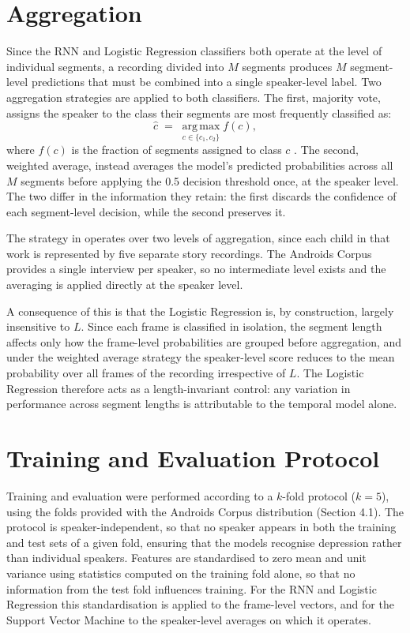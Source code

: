\documentclass{mproj}
\begin{document}
\section{Aggregation}\label{sec:aggregation}

Since the RNN and Logistic Regression classifiers both operate at the level of individual segments, a recording divided into $M$ segments produces $M$ segment-level predictions that must be combined into a single speaker-level label. Two aggregation strategies are applied to both classifiers. The first, majority vote, assigns the speaker to the class their segments are most frequently classified as:
%
\begin{equation}
\hat{c} \;=\; \operatorname*{arg\,max}_{c \in \{c_1, c_2\}} f(c),
\end{equation}
%
where $f(c)$ is the fraction of segments assigned to class $c$ \cite{alsofyani2021}. The second, weighted average, instead averages the model's predicted probabilities across all $M$ segments before applying the 0.5 decision threshold once, at the speaker level. The two differ in the information they retain: the first discards the confidence of each segment-level decision, while the second preserves it.

The strategy in \cite{alsofyani2021} operates over two levels of aggregation, since each child in that work is represented by five separate story recordings. The Androids Corpus provides a single interview per speaker, so no intermediate level exists and the averaging is applied directly at the speaker level.

A consequence of this is that the Logistic Regression is, by construction, largely insensitive to $L$. Since each frame is classified in isolation, the segment length affects only how the frame-level probabilities are grouped before aggregation, and under the weighted average strategy the speaker-level score reduces to the mean probability over all frames of the recording irrespective of $L$. The Logistic Regression therefore acts as a length-invariant control: any variation in performance across segment lengths is attributable to the temporal model alone.

\section{Training and Evaluation Protocol}\label{sec:training}

Training and evaluation were performed according to a $k$-fold protocol ($k = 5$), using the folds provided with the Androids Corpus distribution (Section 4.1). The protocol is speaker-independent, so that no speaker appears in both the training and test sets of a given fold, ensuring that the models recognise depression rather than individual speakers. Features are standardised to zero mean and unit variance using statistics computed on the training fold alone, so that no information from the test fold influences training. For the RNN and Logistic Regression this standardisation is applied to the frame-level vectors, and for the Support Vector Machine to the speaker-level averages on which it operates.
\end{document}
